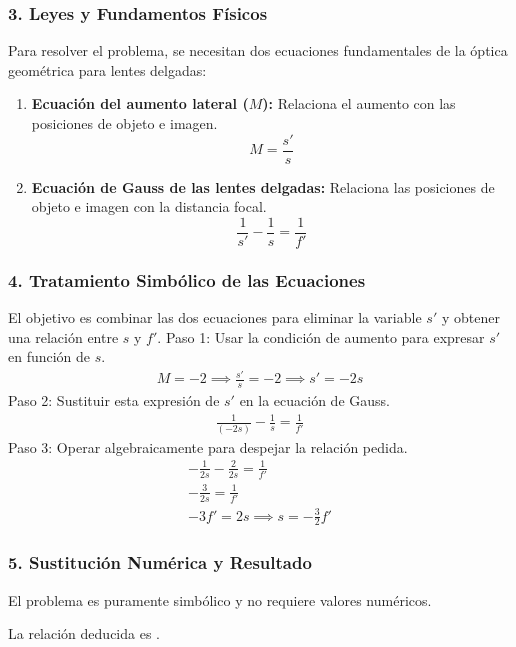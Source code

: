 \subsubsection*{3. Leyes y Fundamentos Físicos}
Para resolver el problema, se necesitan dos ecuaciones fundamentales de la óptica geométrica para lentes delgadas:
\begin{enumerate}
    \item \textbf{Ecuación del aumento lateral ($M$):} Relaciona el aumento con las posiciones de objeto e imagen.
    $$ M = \frac{s'}{s} $$
    \item \textbf{Ecuación de Gauss de las lentes delgadas:} Relaciona las posiciones de objeto e imagen con la distancia focal.
    $$ \frac{1}{s'} - \frac{1}{s} = \frac{1}{f'} $$
\end{enumerate}

\subsubsection*{4. Tratamiento Simbólico de las Ecuaciones}
El objetivo es combinar las dos ecuaciones para eliminar la variable $s'$ y obtener una relación entre $s$ y $f'$.
Paso 1: Usar la condición de aumento para expresar $s'$ en función de $s$.
\begin{gather}
    M = -2 \implies \frac{s'}{s} = -2 \implies s' = -2s
\end{gather}
Paso 2: Sustituir esta expresión de $s'$ en la ecuación de Gauss.
\begin{gather}
    \frac{1}{(-2s)} - \frac{1}{s} = \frac{1}{f'}
\end{gather}
Paso 3: Operar algebraicamente para despejar la relación pedida.
\begin{gather}
    -\frac{1}{2s} - \frac{2}{2s} = \frac{1}{f'} \nonumber \\
    -\frac{3}{2s} = \frac{1}{f'} \nonumber \\
    -3f' = 2s \implies s = -\frac{3}{2}f'
\end{gather}

\subsubsection*{5. Sustitución Numérica y Resultado}
El problema es puramente simbólico y no requiere valores numéricos.
\begin{cajaresultado}
    La relación deducida es .
\end{cajaresultado}

